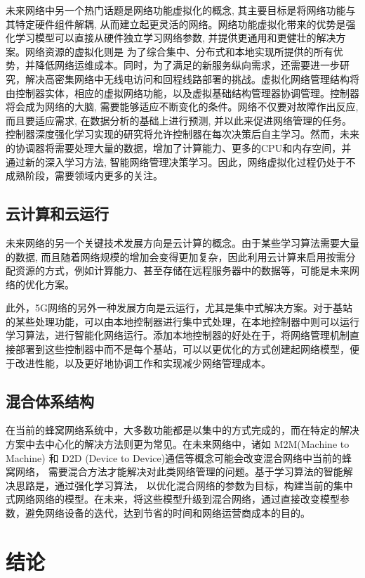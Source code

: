 \documentclass{IEEEtran}
\begin{document}
未来网络中另一个热门话题是网络功能虚拟化的概念, 其主要目标是将网络功能与其特定硬件组件解耦, 从而建立起更灵活的网络。网络功能虚拟化带来的优势是强化学习模型可以直接从硬件独立学习网络参数, 并提供更通用和更健壮的解决方案。网络资源的虚拟化则是 为了综合集中、分布式和本地实现所提供的所有优势，并降低网络运维成本。同时，为了满足的新服务纵向需求，还需要进一步研究，解决高密集网络中无线电访问和回程线路部署的挑战。虚拟化网络管理结构将由控制器实体，相应的虚拟网络功能，以及虚拟基础结构管理器协调管理。控制器将会成为网络的大脑, 需要能够适应不断变化的条件。网络不仅要对故障作出反应, 而且要适应需求, 在数据分析的基础上进行预测, 并以此来促进网络管理的任务。控制器深度强化学习实现的研究将允许控制器在每次决策后自主学习。然而，未来的协调器将需要处理大量的数据，增加了计算能力、更多的CPU和内存空间，并通过新的深入学习方法, 智能网络管理决策学习。因此，网络虚拟化过程仍处于不成熟阶段，需要领域内更多的关注。

\subsection{云计算和云运行}
未来网络的另一个关键技术发展方向是云计算的概念。由于某些学习算法需要大量的数据, 而且随着网络规模的增加会变得更加复杂，因此利用云计算来启用按需分配资源的方式，例如计算能力、甚至存储在远程服务器中的数据等，可能是未来网络的优化方案。

此外，5G网络的另外一种发展方向是云运行，尤其是集中式解决方案。对于基站的某些处理功能，可以由本地控制器进行集中式处理，在本地控制器中则可以运行学习算法，进行智能化网络运行。添加本地控制器的好处在于，将网络管理机制直接部署到这些控制器中而不是每个基站，可以以更优化的方式创建起网络模型，便于改进性能，以及更好地协调工作和实现减少网络管理成本。

\subsection{混合体系结构}
在当前的蜂窝网络系统中，大多数功能都是以集中的方式完成的，而在特定的解决方案中去中心化的解决方法则更为常见。在未来网络中，诸如 M2M(Machine to Machine) 和 D2D (Device to Device)通信等概念可能会改变混合网络中当前的蜂窝网络， 需要混合方法才能解决对此类网络管理的问题。基于学习算法的智能解决思路是，通过强化学习算法， 以优化混合网络的参数为目标，构建当前的集中式网络网络的模型。在未来，将这些模型升级到混合网络，通过直接改变模型参数，避免网络设备的迭代，达到节省的时间和网络运营商成本的目的。

\section{结论}
\label{sec:Conclusion}
\end{document}
